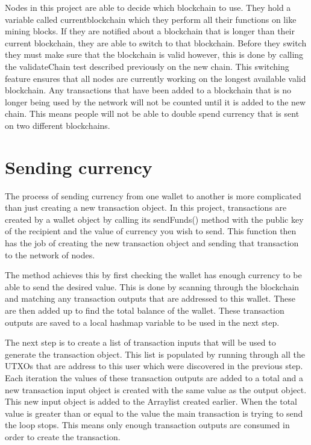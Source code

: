 \documentclass{l4proj}
\begin{document}
Nodes in this project are able to decide which blockchain to use. They hold a variable called currentblockchain
which they perform all their functions on like mining blocks. If they are notified about a blockchain that is
longer than their current blockchain, they are able to switch to that blockchain. Before they switch they must 
make sure that the blockchain is valid however, this is done by calling the validateChain test described previously
on the new chain. This switching feature ensures that all nodes are currently working on the longest available
valid blockchain. Any transactions that have been added to a blockchain that is no longer being used by the network
will not be counted until it is added to the new chain. This means people will not be able to double spend currency
that is sent on two different blockchains.

\section{Sending currency}
The process of sending currency from one wallet to another is more complicated than just creating a new transaction
object. In this project, transactions are created by a wallet object by calling its sendFunds() method with
the public key of the recipient and the value of currency you wish to send. This function then has the job of
creating the new transaction object and sending that transaction to the network of nodes.

The method achieves this by first checking the wallet has enough currency to be able to send the desired value.
This is done by scanning through the blockchain and matching any transaction outputs that are addressed to this 
wallet. These are then added up to find the total balance of the wallet. These transaction outputs are saved to a
local hashmap variable to be used in the next step.

The next step is to create a list of transaction inputs that will be used to generate the transaction object.
This list is populated by running through all the UTXOs that are address to this user which were discovered in 
the previous step. Each iteration the values of these transaction outputs are added to a total and a new 
transaction input object is created with the same value as the output object. This new input object is added
to the Arraylist created earlier. When the total value is greater than or equal to the value the main transaction
is trying to send the loop stops. This means only enough transaction outputs are consumed in order to create the
transaction.
\end{document}
